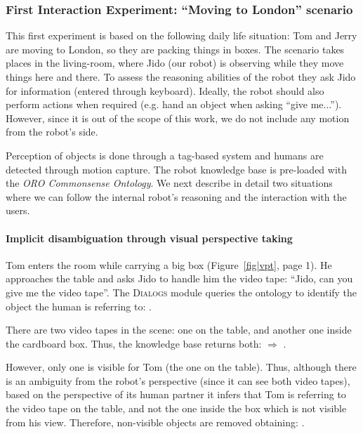 \subsubsection{First Interaction Experiment: ``Moving to London'' scenario}
\label{sect|expe1}

This first experiment is based on the following daily life situation: Tom and
Jerry are moving to London, so they are packing things in boxes. The scenario
takes places in the living-room, where Jido (our robot) is observing while they
move things here and there. To assess the reasoning abilities of the robot they
ask Jido for information (entered through keyboard). Ideally, the robot should
also perform actions when required (e.g. hand an object when asking ``give
me...''). However, since it is out of the scope of this work, we do not include
any motion from the robot's side.

Perception of objects is done through a tag-based system and humans are
detected through motion capture. The robot knowledge base is pre-loaded with
the \emph{ORO Commonsense Ontology}.  We next describe in detail two
situations where we can follow the internal robot's reasoning and the
interaction with the users.

\paragraph{Implicit disambiguation through visual perspective taking}

Tom enters the room while carrying a big box (Figure~\ref{fig|vpt}, page 1). He
approaches the table and asks Jido to handle him the video tape: ``Jido, can
you give me the video tape''. The \textsc{Dialogs} module queries the ontology to
identify the object the human is referring to: . 

There are two video tapes in the scene: one on the table, and another one
inside the cardboard box. Thus, the knowledge base returns both: $\Rightarrow$
. 

However, only one is visible for Tom (the one on the
table). Thus, although there is an ambiguity from the robot's perspective
(since it can see both video tapes), based on the perspective of its human
partner it infers that Tom is referring to the video tape on the table, and not
the one inside the box which is not visible from his view. Therefore,
non-visible objects are removed obtaining: .

